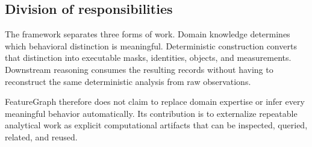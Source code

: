\subsection{Division of responsibilities}

The framework separates three forms of work. Domain knowledge determines which behavioral distinction is meaningful. Deterministic construction converts that distinction into executable masks, identities, objects, and measurements. Downstream reasoning consumes the resulting records without having to reconstruct the same deterministic analysis from raw observations.

FeatureGraph therefore does not claim to replace domain expertise or infer every meaningful behavior automatically. Its contribution is to externalize repeatable analytical work as explicit computational artifacts that can be inspected, queried, related, and reused.
